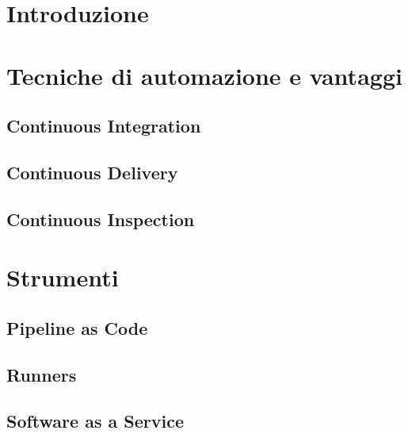 
\section{Introduzione}

\section{Tecniche di automazione e vantaggi}
\subsection{Continuous Integration}

\subsection{Continuous Delivery}

\subsection{Continuous Inspection}

\section{Strumenti}
\subsection{Pipeline as Code}

\subsection{Runners}

\subsection{Software as a Service}

